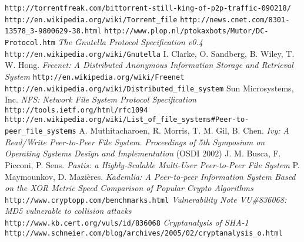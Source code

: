 \documentclass[a4wide,12pt]{report}
\newcommand{\url}[1]{\texttt{#1}}
\begin{document}
\begin{thebibliography}{99}
        \url{http://torrentfreak.com/bittorrent-still-king-of-p2p-traffic-090218/}
        \url{http://en.wikipedia.org/wiki/Torrent\_file}
        \url{http://news.cnet.com/8301-13578\_3-9800629-38.html}
        \url{http://www.plop.nl/ptokaxbots/Mutor/DC-Protocol.htm}
        \emph{The Gnutella Protocol Specification v0.4}
        \url{http://en.wikipedia.org/wiki/Gnutella}
        I. Clarke, O. Sandberg, B. Wiley, T. W. Hong.
        \emph{Freenet: A Distributed Anonymous Information Storage and Retrieval System}
        \url{http://en.wikipedia.org/wiki/Freenet}
        \url{http://en.wikipedia.org/wiki/Distributed\_file\_system}
        Sun Microsystems, Inc.
        \emph{NFS: Network File System Protocol Specification}\\
        \url{http://tools.ietf.org/html/rfc1094}
        \url{http://en.wikipedia.org/wiki/List\_of\_file\_systems\#Peer-to-peer\_file\_systems}
        A. Muthitacharoen, R. Morris, T. M. Gil, B. Chen.
        \emph{Ivy: A Read/Write Peer-to-Peer File System.}
        \emph{Proceedings of 5th Symposium on Operating Systems Design and Implementation}
        (OSDI 2002)
        J. M. Busca, F. Picconi, P. Sens.
        \emph{Pastis: a Highly-Scalable Multi-User Peer-to-Peer File System}
        P. Maymounkov, D. Mazières.
        \emph{Kademlia: A Peer-to-peer Information System Based on the XOR Metric}
        \emph{Speed Comparison of Popular Crypto Algorithms}\\
        \url{http://www.cryptopp.com/benchmarks.html}
        \emph{Vulnerability Note VU\#836068: MD5 vulnerable to collision attacks} \\
        \url{http://www.kb.cert.org/vuls/id/836068}
        \emph{Cryptanalysis of SHA-1} \\
        \url{http://www.schneier.com/blog/archives/2005/02/cryptanalysis\_o.html}
\end{thebibliography}
\end{document}
